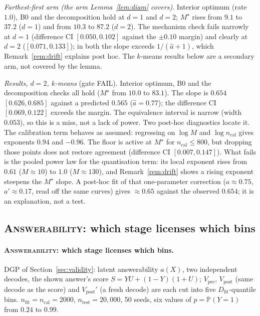 \documentclass[twoside]{article}
\theoremstyle{definition}
\theoremstyle{remark}
\newcommand{\Dfit}{D_{\mathrm{fit}}}
\renewcommand{\P}{\mathbb{P}}
\newcommand{\1}{\mathbf{1}}
\newcommand{\expname}[1]{\textsc{#1}}
\begin{document}
\emph{Farthest-first arm (the arm Lemma~\ref{lem:diam} covers)}. Interior optimum (rate
$1.0$), B0 and the decomposition hold at $d=1$ and $d=2$; $M^\star$ rises from $9.1$ to $37.2$
($d=1$) and from $10.3$ to $87.2$ ($d=2$). The mechanism check fails narrowly at $d=1$ (difference
CI $[0.050,0.102]$ against the $\pm0.10$ margin) and clearly at $d=2$ ($[0.071,0.133]$); in both
the slope exceeds $1/(\hat a+1)$, which Remark~\ref{rem:drift} explains post hoc. The $k$-means results
below are a secondary arm, not covered by the lemma.

\emph{Results, $d=2$, $k$-means} (gate FAIL). Interior optimum, B0 and the decomposition checks all hold
($M^\star$ from $10.0$ to $83.1$). The slope is $0.654$ $[0.626,0.685]$ against a predicted
$0.565$ ($\hat a=0.77$); the difference CI $[0.069,0.122]$ exceeds the margin. The equivalence interval is narrow (width $0.053$), so this is a miss, not a lack of power.
Two post-hoc diagnostics locate it. The calibration term behaves as assumed: regressing on
$\log M$ and $\log n_{\mathrm{cal}}$ gives exponents $0.94$ and $-0.96$. The floor is active at
$M^\star$ for $n_{\mathrm{cal}}\le800$, but dropping those points does not restore agreement
(difference CI $[0.007,0.147]$). What fails is the pooled power law for the quantisation term:
its local exponent rises from $0.61$ ($M\approx10$) to $1.0$ ($M\approx130$), and
Remark~\ref{rem:drift} shows a rising exponent steepens the $M^\star$ slope. A post-hoc fit of
that one-parameter correction ($a\approx0.75$, $a'\approx0.17$, read off the same curves) gives
$\approx0.65$ against the observed $0.654$; it is an explanation, not a test.
\subsection{\expname{Answerability}: which stage licenses which bins}
\label{app:x4}
\paragraph{\expname{Answerability}: which stage licenses which bins.}
DGP of Section~\ref{sec:validity}: latent answerability $a(X)$, two independent decodes, the
shown answer's score $S=YU+(1-Y)(1+U)$; $V_{\mathrm{pre}}$, $V_{\mathrm{post}}$ (same decode
as the score) and $V_{\mathrm{post}}'$ (a fresh decode) are each cut into five $\Dfit$-quantile
bins. $n_{\mathrm{fit}}=n_{\mathrm{cal}}=2000$, $n_{\mathrm{test}}=20{,}000$, 50 seeds, six
values of $p=\P(Y=1)$ from $0.24$ to $0.99$. 
\end{document}
